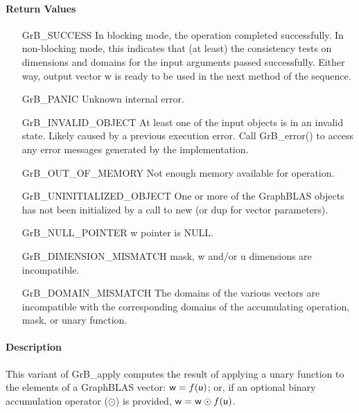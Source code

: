 \paragraph{Return Values}

\begin{itemize}[leftmargin=2.1in]
    \item[{\sf GrB\_SUCCESS}]         In blocking mode, the operation completed
	    successfully. In non-blocking mode, this indicates that (at least) the consistency 
    tests on dimensions and domains for the input arguments passed successfully. 
    Either way, output vector {\sf w} is ready to be used in the next method of 
    the sequence.

    \item[{\sf GrB\_PANIC}]            Unknown internal error.
    
    \item[{\sf GrB\_INVALID\_OBJECT}] At least one of the input objects is
	    in an invalid state. Likely caused by a previous execution error.
    Call {\sf GrB\_error()} to access 
    any error messages generated by the implementation.

    \item[{\sf GrB\_OUT\_OF\_MEMORY}]  Not enough memory available for operation.
    
    \item[{\sf GrB\_UNINITIALIZED\_OBJECT}] One or more of the GraphBLAS objects 
    has not been initialized by a call to {\sf new} (or {\sf dup} for vector
    parameters).
    
    \item[{\sf GrB\_NULL\_POINTER}]  {\sf w} pointer is {\sf NULL}.
    
    \item[{\sf GrB\_DIMENSION\_MISMATCH}]  {\sf mask}, {\sf w} and/or {\sf u} dimensions are
    incompatible. 
    
    \item[{\sf GrB\_DOMAIN\_MISMATCH}]    The domains of the various vectors are
	incompatible with the corresponding domains of the accumulating operation, 
    mask, or unary function.
\end{itemize}

\paragraph{Description}

This variant of {\sf GrB\_apply} computes the result of applying a unary function
to the elements of a GraphBLAS vector:
${\sf w} = f({\sf u})$; or, if an optional binary accumulation 
operator ($\odot$) is provided, ${\sf w} = {\sf w} \odot f({\sf u})$.  

